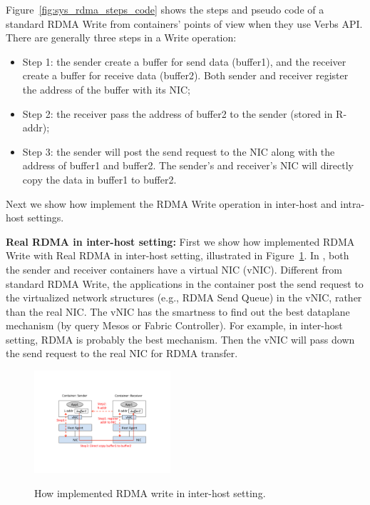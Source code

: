 Figure~\ref{fig:sys_rdma_steps_code} shows the steps and pseudo code of 
a standard RDMA Write from containers' points of view when they use Verbs API. 
There are generally three steps in a Write operation:
\begin{itemize}
  \item Step 1: the sender create a buffer for send data (buffer1), and the receiver create a buffer for receive data (buffer2). 
Both sender and receiver register the address of the buffer with its NIC;
  \item Step 2: the receiver pass the address of buffer2 to the sender (stored in R-addr);
  \item Step 3: the sender will post the send request to the NIC along with the address of buffer1 and buffer2. The sender's
  and receiver's NIC will directly copy the data in buffer1 to buffer2.
\end{itemize}
Next we show how \sysname implement the RDMA Write operation in inter-host and intra-host settings.

\textbf{Real RDMA in inter-host setting:} First we show 
how \sysname implemented RDMA Write with Real RDMA in inter-host setting,
illustrated in Figure~\ref{fig:sys_rdma_rdma}. 
In \sysname, both the sender and receiver containers have a virtual NIC (vNIC).
Different from standard RDMA Write, the applications in the container post
the send request to the virtualized network structures (e.g., RDMA Send Queue)
in the vNIC, rather than the real NIC.
The vNIC has the smartness to find out the best dataplane mechanism (by query
Mesos or Fabric Controller).
For example, in inter-host setting, RDMA is probably the best mechanism. Then
the vNIC will pass down the send request to the real NIC for RDMA transfer.

     \begin{figure}[th]
     \centering 
     \includegraphics[width=0.45\textwidth]{figures/system/sys_rdma_rdma.pdf}
     \label{fig:sys_rdma_rdma}
     \caption{How \sysname implemented RDMA write in inter-host setting.} 
     \end{figure}

